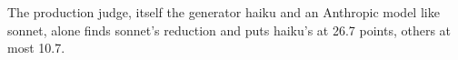 The production judge, itself the generator haiku and an Anthropic model like
sonnet, alone finds sonnet's reduction and puts haiku's at 26.7 points,
others at most 10.7.

